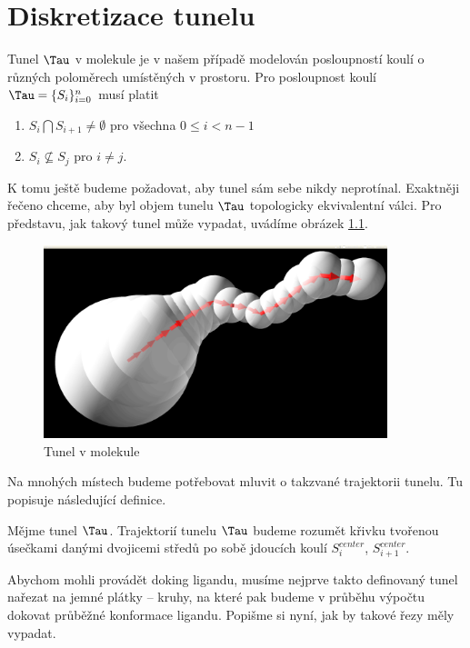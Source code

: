 \chapter{Diskretizace tunelu}
\setcounter{page}{1}

Tunel $ \Tau $ v molekule je v našem případě modelován posloupností koulí o různých
poloměrech umístěných v prostoru. Pro posloupnost koulí $ \Tau = \{S_i\}_{i=0}^{n} $
musí platit

    \begin{enumerate}[label={(\arabic*)}]
        \item $ S_i \bigcap S_{i+1} \neq \emptyset $ pro všechna $ 0 \leq i < n - 1$
        \item $ S_i \nsubseteq S_j$  pro $ i \neq j $.
    \end{enumerate}

K tomu ještě budeme požadovat, aby tunel sám sebe nikdy neprotínal. Exaktněji řečeno
chceme, aby byl objem tunelu $ \Tau $ topologicky ekvivalentní válci.
Pro představu, jak takový tunel může vypadat, uvádíme obrázek \ref{fig:basic_tunnel}.
\begin{figure}[ht]
    \centering
    \includegraphics[width=100mm]{img/basic_tunnel.jpg}
    \caption{Tunel v molekule}
  \centering
  \label{fig:basic_tunnel}
\end{figure}

Na mnohých místech budeme potřebovat mluvit o takzvané trajektorii tunelu. Tu popisuje
následující definice.

\begin{defi}
Mějme tunel $ \Tau $. Trajektorií tunelu $ \Tau $ budeme rozumět křivku tvořenou
úsečkami danými dvojicemi středů po sobě jdoucích koulí $ S_i^{center} $,
$ S_{i+1}^{center} $.
\end{defi}

Abychom mohli provádět doking ligandu, musíme nejprve takto definovaný tunel nařezat na
jemné plátky – kruhy, na které pak budeme v průběhu výpočtu dokovat průběžné konformace ligandu.
Popišme si nyní, jak by takové řezy měly vypadat.

